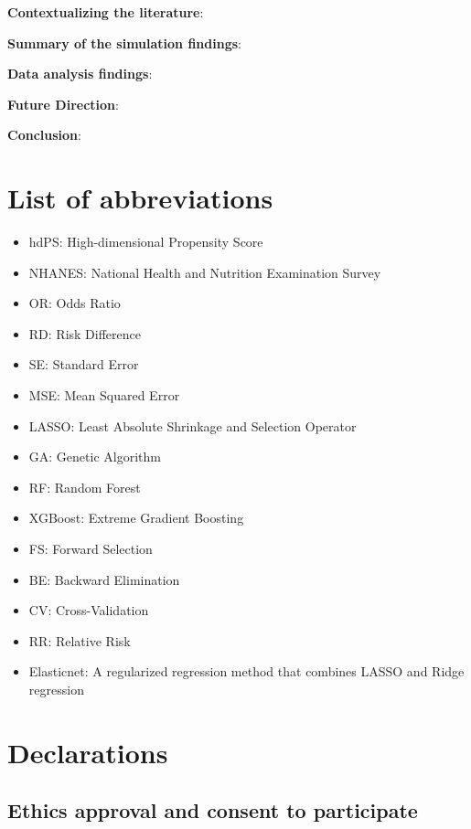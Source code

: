 \documentclass[sn-vancouver,Numbered,lineno,pdflatex]{sn-jnl}
\providecommand{\tightlist}{%
  \setlength{\itemsep}{0pt}\setlength{\parskip}{0pt}}
\begin{document}
\textbf{Contextualizing the literature}:

\textbf{Summary of the simulation findings}:

\textbf{Data analysis findings}:

\textbf{Future Direction}:

\textbf{Conclusion}:

\section*{List of abbreviations}\label{list-of-abbreviations}

\begin{itemize}
\tightlist
\item
  hdPS: High-dimensional Propensity Score
\item
  NHANES: National Health and Nutrition Examination Survey
\item
  OR: Odds Ratio
\item
  RD: Risk Difference
\item
  SE: Standard Error
\item
  MSE: Mean Squared Error
\item
  LASSO: Least Absolute Shrinkage and Selection Operator
\item
  GA: Genetic Algorithm
\item
  RF: Random Forest
\item
  XGBoost: Extreme Gradient Boosting
\item
  FS: Forward Selection
\item
  BE: Backward Elimination
\item
  CV: Cross-Validation
\item
  RR: Relative Risk
\item
  Elasticnet: A regularized regression method that combines LASSO and
  Ridge regression
\end{itemize}

\section*{Declarations}\label{declarations}

\subsection*{Ethics approval and consent to
participate}\label{ethics-approval-and-consent-to-participate}
\end{document}
